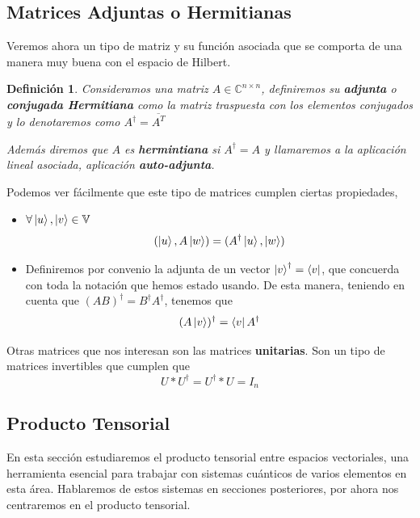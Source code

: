 \documentclass[a4paper]{article}
\newtheorem{deff}{Definición}[section]
\numberwithin{equation}{section}
\begin{document}
\subsection{Matrices Adjuntas o Hermitianas}
Veremos ahora un tipo de matriz y su función asociada que se comporta de una manera muy buena con el espacio de Hilbert.

\begin{deff}Consideramos una matriz $A \in \mathbb{C}^{n\times n}$, definiremos su \textbf{adjunta} o \textbf{conjugada Hermitiana} como la matriz traspuesta con los elementos conjugados y lo denotaremos como $A^\dagger = \overline{A^T}$

Además diremos que $A$ es \textbf{hermintiana} si $A^\dagger = A$ y llamaremos a la aplicación lineal asociada, aplicación \textbf{auto-adjunta}.

\end{deff}

Podemos ver fácilmente que este tipo de matrices cumplen ciertas propiedades,
\begin{itemize}

\item $\forall \ket{u}, \ket{v} \in \mathbb{V}$
\begin{equation}
(\ket{u}, A \ket{w}) = (A^\dagger \ket{u},\ket{w})
\end{equation}

\item Definiremos por convenio la adjunta de un vector $\ket{v}^\dagger = \bra{v}$, que concuerda con toda la notación que hemos estado usando. De esta manera, teniendo en cuenta que $(AB)^\dagger = B^\dagger A^\dagger$, tenemos que
\begin{equation}
(A\ket{v})^\dagger = \bra{v}A^\dagger
\end{equation}
\end{itemize}

Otras matrices que nos interesan son las matrices \textbf{unitarias}. Son un tipo de matrices invertibles que cumplen que
\begin{equation}
U * U^\dagger = U^\dagger * U = I_n
\end{equation}

\subsection{Producto Tensorial}

En esta sección estudiaremos el producto tensorial entre espacios vectoriales, una herramienta esencial para trabajar con sistemas cuánticos de varios elementos en esta área. Hablaremos de estos sistemas en secciones posteriores, por ahora nos centraremos en el producto tensorial.
\end{document}
